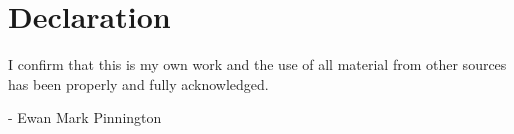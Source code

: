 
\vspace{40mm}
\chapter*{\centering \Large \vspace{-20mm}\Huge Declaration}

\par I confirm that this is my own work and the use of all material from other sources has been properly and fully acknowledged.

\vspace*{2cm}
- Ewan Mark Pinnington %

\newpage

